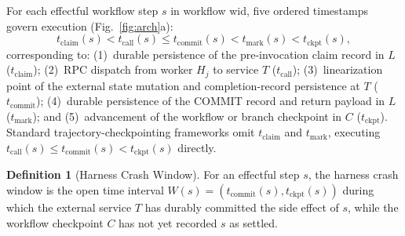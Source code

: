 \documentclass[10pt,journal]{IEEEtran}
\def\texttt#1{#1}%
\theoremstyle{definition}
\newtheorem{definition}{Definition}
\theoremstyle{remark}
\begin{document}
For each effectful workflow step $s$ in workflow \texttt{wid}, five ordered timestamps govern execution (Fig.~\ref{fig:arch}a):
\begin{equation}\label{eq:timeline}
  t_{\mathrm{claim}}(s) < t_{\mathrm{call}}(s) \le t_{\mathrm{commit}}(s) < t_{\mathrm{mark}}(s) < t_{\mathrm{ckpt}}(s),
\end{equation}
corresponding to: (1)~durable persistence of the pre-invocation claim record in $L$ ($t_{\mathrm{claim}}$); (2)~RPC dispatch from worker $H_j$ to service $T$ ($t_{\mathrm{call}}$); (3)~linearization point of the external state mutation and completion-record persistence at $T$ ($t_{\mathrm{commit}}$); (4)~durable persistence of the \texttt{COMMIT} record and return payload in $L$ ($t_{\mathrm{mark}}$); and (5)~advancement of the workflow or branch checkpoint in $C$ ($t_{\mathrm{ckpt}}$). Standard trajectory-checkpointing frameworks omit $t_{\mathrm{claim}}$ and $t_{\mathrm{mark}}$, executing $t_{\mathrm{call}}(s) \le t_{\mathrm{commit}}(s) < t_{\mathrm{ckpt}}(s)$ directly.

\begin{definition}[Harness Crash Window]\label{def:window}
For an effectful step $s$, the harness crash window is the open time interval $W(s) = (t_{\mathrm{commit}}(s), t_{\mathrm{ckpt}}(s))$ during which the external service $T$ has durably committed the side effect of $s$, while the workflow checkpoint $C$ has not yet recorded $s$ as settled.
\end{definition}
\end{document}
